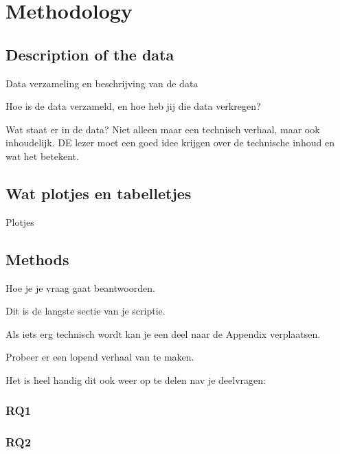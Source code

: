 \section{Methodology}
\label{sec:meth}


\subsection{Description of the data}
Data verzameling en beschrijving van de data

Hoe is de data verzameld, en hoe heb jij die data verkregen?


Wat staat er in de data? Niet alleen maar een technisch verhaal, maar ook inhoudelijk. DE lezer moet een goed idee krijgen over de technische inhoud en wat het betekent.

\pagebreak
\subsection{Wat plotjes en tabelletjes}
Plotjes

\pagebreak

\pagebreak
\subsection{Methods}
Hoe je je vraag gaat beantwoorden.


Dit is de langste sectie van je scriptie. 

Als iets erg technisch wordt kan je een deel naar de Appendix verplaatsen. 

Probeer er een lopend verhaal van te maken.

Het is heel handig dit ook weer op te delen nav je deelvragen:

\subsubsection{RQ1}

\subsubsection{RQ2}